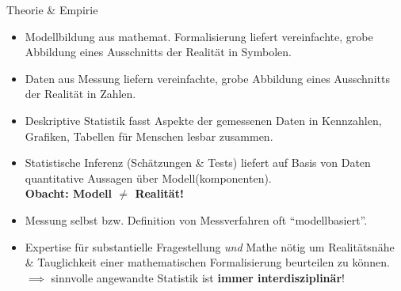 \documentclass[
  10pt,
  ignorenonframetext,
]{beamer}
\begin{document}
\begin{frame}{Theorie \& Empirie}
\label{theorie-empirie-2}
\begin{itemize}
\item
  Modellbildung aus mathemat. Formalisierung liefert vereinfachte, grobe
  Abbildung eines Ausschnitts der Realität in Symbolen.
\item
  Daten aus Messung liefern vereinfachte, grobe Abbildung eines
  Ausschnitts der Realität in Zahlen.
\item
  Deskriptive Statistik fasst Aspekte der gemessenen Daten in
  Kennzahlen, Grafiken, Tabellen für Menschen lesbar zusammen.
\item
  Statistische Inferenz (Schätzungen \& Tests) liefert auf Basis von
  Daten quantitative Aussagen über Modell(komponenten).\\
  \textbf{Obacht: Modell \(\neq\) Realität!}
\item
  Messung selbst bzw. Definition von Messverfahren oft
  ``modellbasiert''.
\item
  Expertise für substantielle Fragestellung \emph{und} Mathe nötig um
  Realitätsnähe \& Tauglichkeit einer mathematischen Formalisierung
  beurteilen zu können.\\
  \(\implies\) sinnvolle angewandte Statistik ist \textbf{immer
  interdisziplinär}!
\end{itemize}
\end{frame}
\end{document}
